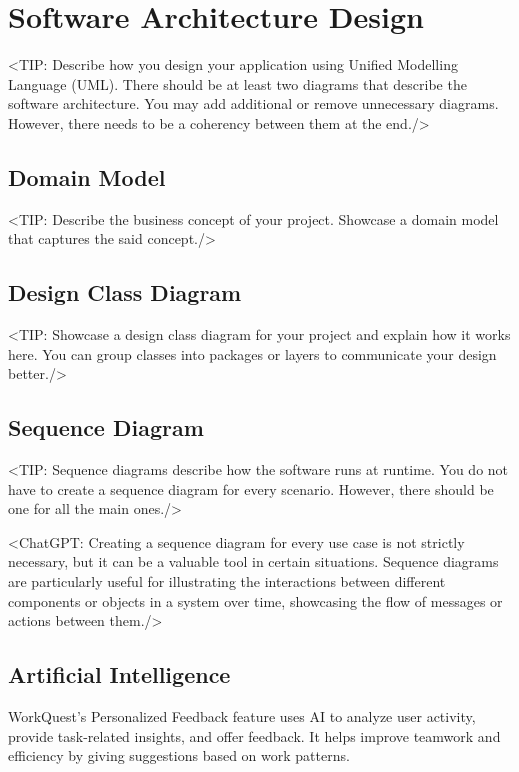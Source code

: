 
\chapter{Software Architecture Design}
\label{chap:software-architecture-design}
<TIP: Describe how you design your application using Unified Modelling
Language (UML). There should be at least two diagrams that describe the
software architecture. You may add additional or remove unnecessary diagrams.
However, there needs to be a coherency between them at the end./>

\section{Domain Model}
\label{section:domain-model}
<TIP: Describe the business concept of your project. Showcase a
domain model that captures the said concept./>

\section{Design Class Diagram}
\label{section:design-class-diagram}
<TIP: Showcase a design class diagram for your project and explain
how it works here. You can group classes into packages or layers to communicate your
design better./>

\section{Sequence Diagram}
\label{section:sequence-diagram}
<TIP: Sequence diagrams describe how the software runs at runtime.
You do not have to create a sequence diagram for every scenario. However,
there should be one for all the main ones./>

<ChatGPT: Creating a sequence diagram for every use case is not
strictly necessary, but it can be a valuable tool in certain situations. Sequence
diagrams are particularly useful for illustrating the interactions between different
components or objects in a system over time, showcasing the flow of messages
or actions between them./>

\section{Artificial Intelligence}
\label{section:artificial-intelligence}
WorkQuest's Personalized Feedback feature uses AI to analyze user activity, provide task-related insights, and offer feedback. It helps improve teamwork and efficiency by giving suggestions based on work patterns.

